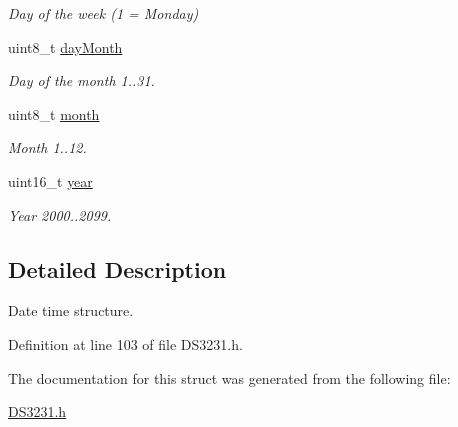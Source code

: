 \begin{DoxyCompactItemize}
\begin{DoxyCompactList}\small\item\em Day of the week (1 = Monday) \end{DoxyCompactList}\item 
uint8\+\_\+t \hyperlink{struct_d_s3231___date_time__s_a8b56b99decfd2f8d57ad7adba7e699bf}{day\+Month}\hypertarget{struct_d_s3231___date_time__s_a8b56b99decfd2f8d57ad7adba7e699bf}{}\label{struct_d_s3231___date_time__s_a8b56b99decfd2f8d57ad7adba7e699bf}

\begin{DoxyCompactList}\small\item\em Day of the month 1..31. \end{DoxyCompactList}\item 
uint8\+\_\+t \hyperlink{struct_d_s3231___date_time__s_aa4cd33d1ad2cc42f108386cefa73c218}{month}\hypertarget{struct_d_s3231___date_time__s_aa4cd33d1ad2cc42f108386cefa73c218}{}\label{struct_d_s3231___date_time__s_aa4cd33d1ad2cc42f108386cefa73c218}

\begin{DoxyCompactList}\small\item\em Month 1..12. \end{DoxyCompactList}\item 
uint16\+\_\+t \hyperlink{struct_d_s3231___date_time__s_a30275fe546bc83d3fe9a565a39fccc04}{year}\hypertarget{struct_d_s3231___date_time__s_a30275fe546bc83d3fe9a565a39fccc04}{}\label{struct_d_s3231___date_time__s_a30275fe546bc83d3fe9a565a39fccc04}

\begin{DoxyCompactList}\small\item\em Year 2000..2099. \end{DoxyCompactList}\end{DoxyCompactItemize}


\subsection{Detailed Description}
Date time structure. 

Definition at line 103 of file D\+S3231.\+h.



The documentation for this struct was generated from the following file\+:\begin{DoxyCompactItemize}
\item 
\hyperlink{_d_s3231_8h}{D\+S3231.\+h}\end{DoxyCompactItemize}
